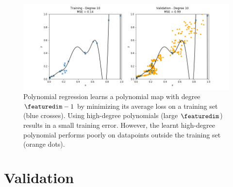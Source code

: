 \documentclass[12pt]{report}
\newcommand{\featurelen}{\featuredim}
\begin{document}
\begin{figure}[htbp]
	\centering
	\includegraphics[width=\textwidth]{OverfittedPolyn.png}  
	\caption{Polynomial regression learns a polynomial map with degree $\featurelen-1$ 
		by minimizing its average loss on a training set (blue crosses). Using high-degree polynomials 
		(large $\featurelen$) results in a small training error. However, the learnt high-degree polynomial 
	 performs poorly on datapoints outside the training set (orange dots).}
	\label{fig_polyn_training}
\end{figure}


\section{Validation}
\label{sec_validate_predictor}
\end{document}
